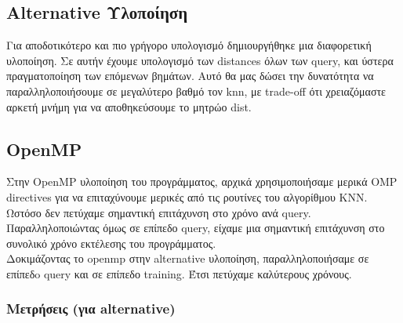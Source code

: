 \documentclass[11pt]{scrartcl} %
\begin{document}
\subsection{Alternative Υλοποίηση}
Για αποδοτικότερο και πιο γρήγορο υπολογισμό δημιουργήθηκε μια διαφορετική υλοποίηση. Σε αυτήν έχουμε υπολογισμό των distances όλων των query,
και ύστερα πραγματοποίηση των επόμενων βημάτων. Αυτό θα μας δώσει την δυνατότητα να παραλληλοποιήσουμε σε μεγαλύτερο βαθμό τον knn, με
trade-off ότι χρειαζόμαστε αρκετή μνήμη για να αποθηκεύσουμε το μητρώο dist.

\subsection{OpenMP}

Στην OpenMP υλοποίηση του προγράμματος, αρχικά χρησιμοποιήσαμε μερικά OMP directives
για να επιταχύνουμε μερικές από τις ρουτίνες του αλγορίθμου ΚΝΝ.
Ωστόσο δεν πετύχαμε σημαντική επιτάχυνση στο χρόνο ανά query.
Παραλληλοποιώντας όμως σε επίπεδο query, είχαμε μια σημαντική επιτάχυνση στο συνολικό χρόνο εκτέλεσης του προγράμματος.
\\

Δοκιμάζοντας το openmp στην alternative υλοποίηση, παραλληλοποιήσαμε σε επίπεδo 
query και σε επίπεδο training. Έτσι πετύχαμε καλύτερους χρόνους.

\subsubsection{Μετρήσεις (για alternative)}
\end{document}
